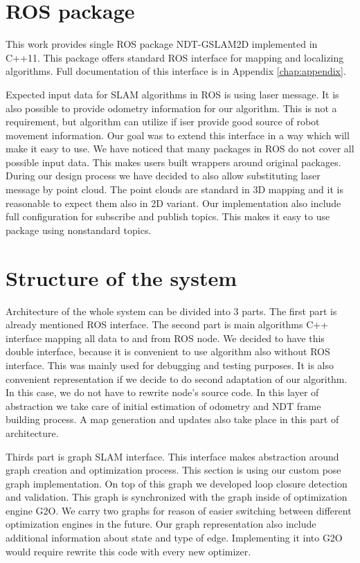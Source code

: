\section{ROS package}
This work provides single \gls{ROS} package NDT-GSLAM2D implemented in C++11. This package offers standard \gls{ROS} interface for mapping and localizing algorithms. Full documentation of this interface is in Appendix \ref{chap:appendix}. 

Expected input data for \gls{SLAM} algorithms in \gls{ROS} is using laser message. It is also possible to provide odometry information for our algorithm. This is not a requirement, but algorithm can utilize if iser provide good source of robot movement information. Our goal was to extend this interface in a way which will make it easy to use. We have noticed that many packages in \gls{ROS} do not cover all possible input data. This makes users built wrappers around original packages. During our design process we have decided to also allow substituting laser message by point cloud. The point clouds are standard in 3D mapping and it is reasonable to expect them also in 2D variant. Our implementation also include full configuration for subscribe and publish topics. This makes it easy to use package using nonstandard topics.  
\section{Structure of the system}
Architecture of the whole system can be divided into 3 parts. The first part is already mentioned \gls{ROS} interface. The second part is main algorithms C++ interface mapping all data to and from \gls{ROS} node. We decided to have this double interface, because it is convenient to use algorithm also without \gls{ROS} interface. This was mainly used for debugging and testing purposes. It is also convenient representation if we decide to do second adaptation of our algorithm. In this case, we do not have to rewrite node's source code. In this layer of abstraction we take care of initial estimation of odometry and \gls{NDT} frame building process. A map generation and updates also take place in this part of architecture.

Thirds part is graph \gls{SLAM} interface. This interface makes abstraction around graph creation and optimization process. This section is using our custom pose graph implementation. On top of this graph we developed loop closure detection and validation. This graph is synchronized with the graph inside of optimization engine G2O. We carry two graphs for reason of easier switching between different optimization engines in the future. Our graph representation also include additional information about state and type of edge. Implementing it into G2O would require rewrite this code with every new optimizer.

